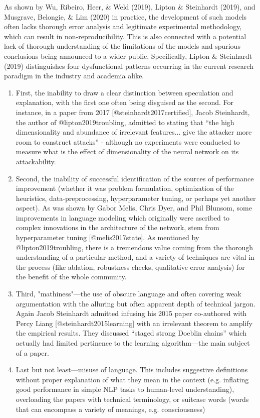 \documentclass[
  10pt,
  dvipsnames,enabledeprecatedfontcommands]{scrartcl}
\begin{document}
As shown by Wu, Ribeiro, Heer, \& Weld (2019), Lipton \& Steinhardt
(2019), and Musgrave, Belongie, \& Lim (2020) in practice, the
development of such models often lacks thorough error analysis and
legitimate experimental methodology, which can result in
non-reproducibility. This is also connected with a potential lack of
thorough understanding of the limitations of the models and spurious
conclusions being announced to a wider public. Specifically, Lipton \&
Steinhardt (2019) distinguishes four dysfunctional patterns occurring in
the current research paradigm in the industry and academia alike.

\renewcommand{\labelenumii}{\Roman{enumii}}
 \begin{enumerate}
\item First, the inability to draw a clear distinction between speculation and explanation, with the first one often being disguised as the second. For instance, in a paper from 2017 [@steinhardt2017certified], Jacob Steinhardt, the author of @lipton2019troubling, admitted to stating that “the high dimensionality and abundance of irrelevant features... give the attacker more room to construct attacks” - although no experiments were conducted to measure what is the effect of dimensionality of the neural network on its attackability. 
\item Second, the inability of successful identification of the sources of performance improvement (whether it was problem formulation, optimization of the heuristics, data-preprocessing, hyperparameter tuning, or perhaps yet another aspect). As was shown by Gabor Melis, Chris Dyer, and Phil Blunsom, some improvements in language modeling which originally were ascribed to complex innovations in the architecture of the network, stem from hyperparameter tuning [@melis2017state]. As mentioned by @lipton2019troubling, there is a tremendous value coming from the thorough understanding of a particular method, and a variety of techniques are vital in the process (like ablation, robustness checks, qualitative error analysis) for the benefit of the whole community.
\item Third, "mathiness"---the use of obscure language and often covering weak argumentation with the alluring but often apparent depth of technical jargon. Again Jacob Steinhardt admitted infusing his 2015 paper co-authored with Percy Liang [@steinhardt2015learning] with an irrelevant theorem to amplify the empirical results. They discussed “staged strong Doeblin chains” which actually had limited pertinence to the learning algorithm---the main subject of a paper. 
\item Last but not least---misuse of language. This includes suggestive definitions without proper explanation of what they mean in the context (e.g. inflating good performance in simple NLP tasks to human-level understanding), overloading the papers with technical terminology, or suitcase words (words that can encompass a variety of meanings, e.g. consciousness) 
 \end{enumerate}
\end{document}
